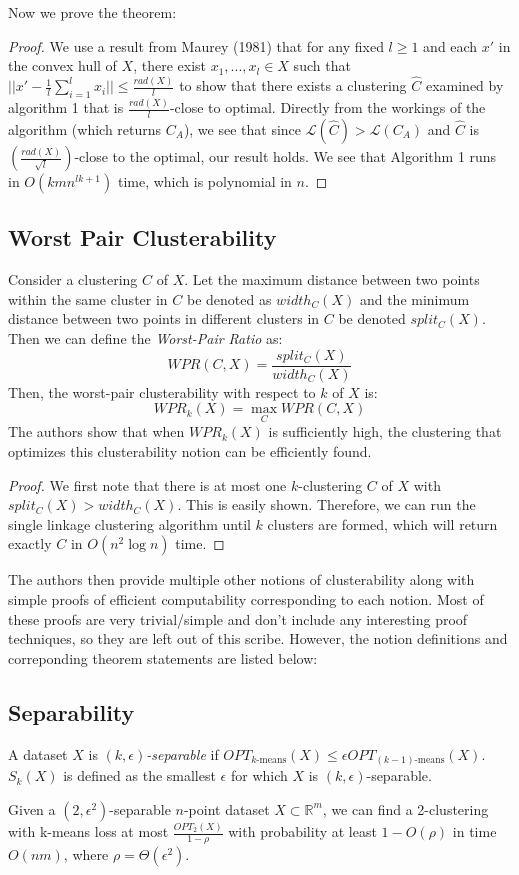 Now we prove the theorem:
\begin{proof}
    We use a result from Maurey (1981) that for any fixed $l\geq 1$ and each $x'$ in the convex hull of $X$, there exist $x_1,...,x_l\in X$ such that $||x'-\frac{1}{l}\sum_{i=1}^l x_i|| \leq \frac{rad(X)}{l}$ to show that there exists a clustering $\hat{C}$ examined by algorithm 1 that is $\frac{rad(X)}{l}$-close to optimal. Directly from the workings of the algorithm (which returns $C_A$), we see that since $\mathcal{L}(\hat{C})>\mathcal{L}(C_A)$ and $\hat{C}$ is $(\frac{rad(X)}{\sqrt{l}})$-close to the optimal, our result holds. We see that Algorithm 1 runs in $O(kmn^{lk+1})$ time, which is polynomial in $n$.
\end{proof}
    
\subsection*{Worst Pair Clusterability}
    Consider a clustering $C$ of $X$. Let the maximum distance between two points within the same cluster in $C$ be denoted as $width_C(X)$ and the minimum distance between two points in different clusters in $C$ be denoted $split_C(X)$. Then we can define the \textit{Worst-Pair Ratio} as:
    $$WPR(C,X) = \frac{split_C(X)}{width_C(X)}$$
    Then, the worst-pair clusterability with respect to $k$ of $X$ is:
    $$WPR_k(X) = \max_{C} WPR(C,X)$$
    The authors show that when $WPR_k(X)$ is sufficiently high, the clustering that optimizes this clusterability notion can be efficiently found.
    \begin{proof}
        We first note that there is at most one $k$-clustering $C$ of $X$ with $split_C(X)>width_C(X)$. This is easily shown. Therefore, we can run the single linkage clustering algorithm until $k$ clusters are formed, which will return exactly $C$ in $O(n^2\log n)$ time.
    \end{proof}
    
    The authors then provide multiple other notions of clusterability along with simple proofs of efficient computability corresponding to each notion. Most of these proofs are very trivial/simple and don't include any interesting proof techniques, so they are left out of this scribe. However, the notion definitions and correponding theorem statements are listed below:
    
    \subsection*{Separability}
    A dataset $X$ is \textit{$(k,\epsilon)$-separable} if $OPT_{\text{$k$-means}}(X) \leq \epsilon OPT_{\text{$(k-1)$-means}}(X)$. $S_k(X)$ is defined as the smallest $\epsilon$ for which $X$ is $(k,\epsilon)$-separable. 
    \begin{theorem}
    Given a $(2,\epsilon^2)$-separable $n$-point dataset $X \subset \mathbb{R}^m$, we can find a 2-clustering with k-means loss at most $\frac{OPT_2(X)}{1-\rho}$ with probability at least $1-O(\rho)$ in time $O(nm)$, where $\rho = \Theta(\epsilon^2)$.
    \end{theorem}
    
